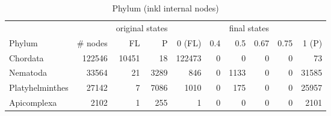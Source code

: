 

      \begin{table}[h!]
        \begin{center}
          \begin{tabular}{ |l|r||r|r||r|r|r|r|r|r| }
            \hline
            & & \multicolumn{2}{c||}{original states} & \multicolumn{6}{c|}{final states} \\
            Phylum & \# nodes & FL & P
              & 0 (FL) & 0.4 & 0.5 & 0.67 & 0.75 & 1 (P) \\
            \hline \hline
            Chordata & 122546 & 10451 & 18 
              & 122473 & 0 & 0 & 0 & 0 & 73 \\
            Nematoda & 33564 & 21 & 3289 
              & 846 & 0 & 1133 & 0 & 0 & 31585 \\
            Platyhelminthes & 27142 & 7 & 7086 
              & 1010 & 0 & 175 & 0 & 0 & 25957 \\
            Apicomplexa & 2102 & 1 & 255 
              & 1 & 0 & 0 & 0 & 0 & 2101 \\
            \hline
          \end{tabular}
        \end{center}
        \caption{Phylum (inkl internal nodes)}
        \label{table:Phylum internal nodes}
      \end{table}

